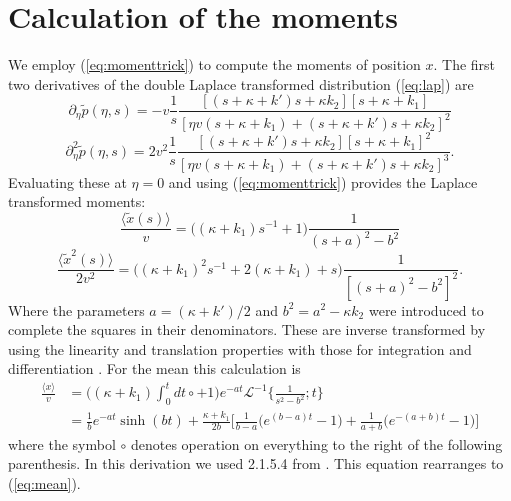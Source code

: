 \documentclass[]{agujournal2018}
\newcommand\be{\begin{equation}}
\newcommand\ee{\end{equation}}
\newcommand\bra{\langle}
\newcommand\ket{\rangle}
\newcommand\tp{\tilde{p}}
\newcommand\El{\mathcal{L}}
\begin{document}

\section{Calculation of the moments}
\label{sec:appendixB}
We employ (\ref{eq:momenttrick}) to compute the moments of position $x$. The first two derivatives of the double Laplace transformed distribution (\ref{eq:lap}) are
\be \partial_\eta \tp(\eta,s) = -v \frac{1}{s}\frac{[(s+\kappa + k')s + \kappa k_2][s+\kappa + k_1]}{[\eta v(s+\kappa +k_1) + (s+ \kappa + k')s+\kappa k_2]^2}\ee
\be \partial_\eta^2 \tp(\eta,s) = 2v^2 \frac{1}{s} \frac{[(s+\kappa + k')s+\kappa k_2][s+\kappa + k_1]^2}{[\eta v(s+\kappa + k_1) + (s+\kappa + k')s+ \kappa k_2]^3}.\ee
Evaluating these at $\eta=0$ and using (\ref{eq:momenttrick}) provides the Laplace transformed moments:
\be  \frac{\bra\tilde{x}(s)\ket} {v} = \Big((\kappa+k_1)s^{-1}+1 \Big)\frac{1}{(s+a)^2-b^2} \label{eq:lapmean}\ee
\be \frac{\bra \tilde{x}^2(s) \ket}{2v^2} = \Big((\kappa+k_1)^2s^{-1} + 2(\kappa+k_1) + s\Big) \frac{1}{[(s+a)^2-b^2]^2}.\label{eq:lapsecondmom}\ee
Where the parameters $a= (\kappa+k')/2$ and $b^2 = a^2 -\kappa k_2$ were introduced to complete the squares in their denominators.
These are inverse transformed by using the linearity and translation properties with those for integration and differentiation \citep[e.g.][]{Arfken1985}.
For the mean this calculation is
\begin{align}
\frac{\bra x \ket}{v} &= \Big((\kappa+k_1)\int_0^t dt \circ+1 \Big)e^{-at}\El^{-1}\Big\{\frac{1}{s^2-b^2};t\Big\}\\
&=  \frac{1}{b}e^{-at}\sinh(bt) + \frac{\kappa + k_1}{2b}\Big[\frac{1}{b-a}\Big(e^{(b-a)t}-1\Big)+ \frac{1}{a+b}\Big(e^{-(a+b)t}-1\Big)\Big]
\end{align}
where the symbol $\circ$ denotes operation on everything to the right of the following parenthesis. In this derivation we used 2.1.5.4 from \citet{Prudnikov1992a}. This equation rearranges to (\ref{eq:mean}).
\end{document}
